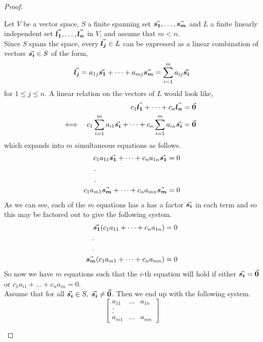 \documentclass[MathsNotesBase.tex]{subfiles}
\begin{document}
{\begin{proof}
\begin{enumerate}[label=(\roman*)]
{				Let $V$ be a vector space, $S$ a finite spanning set ${ \vec{\bm{s_1}}, \dots, \vec{\bm{s_m}} }$ and $L$ a finite linearly independent set ${ \vec{\bm{l_1}},\dots, \vec{\bm{l_n}} }$ in $V$, and assume that ${ m < n }$.\\
				Since $S$ spans the space, every ${ \vec{\bm{l_j}} \in L }$ can be expressed as a linear combination of vectors ${ \vec{\bm{s_i}} \in S }$ of the form,
				\[ \vec{\bm{l_j}} = a_{1j}\vec{\bm{s_1}} + \dots + a_{mj}\vec{\bm{s_m}} = \sum_{i=1}^m a_{ij}\vec{\bm{s_i}} \]
				for ${ 1 \leq j \leq n }$. A linear relation on the vectors of $L$ would look like,
				\begin{align*}
				&& c_1\vec{\bm{l_1}} + \dots + c_n\vec{\bm{l_n}} &= \vec{\bm{0}} \\
				&\iff & c_1\sum_{i=1}^m a_{i1}\vec{\bm{s_i}} + \dots + c_n\sum_{i=1}^m a_{in}\vec{\bm{s_i}}  &= \vec{\bm{0}} &\text{\scriptsize{}}
				\end{align*}
				which expands into $m$ simultaneous equations as follows.
				\begin{align*}
					c_1a_{11}\V{s_1} + \dots + c_na_{1n}\V{s_1}  &= 0 \\
					. \hspace{100pt} & \\
					. \hspace{100pt} & \\
					c_1a_{m1}\V{s_m} + \dots + c_na_{mn}\V{s_m}  &= 0
				\end{align*}
				As we can see, each of the $m$ equations has a has a factor $\vec{\bm{s_i}}$ in each term and so this may be factored out to give the following system.
				\begin{align*}
					\V{s_1}(c_1a_{11} + \dots + c_na_{1n})  &= 0 \\
					. \hspace{100pt} & \\
					. \hspace{100pt} & \\
					\V{s_m}(c_1a_{m1} + \dots + c_na_{mn})  &= 0
				\end{align*}
				So now we have $m$ equations such that the $i$-th equation will hold if either ${ \vec{\bm{s_i}} = \vec{\bm{0}} }$ or ${ c_1a_{i1} + \dots + c_na_{in} = 0 }$.\\
				Assume that for all ${ \vec{\bm{s_i}} \in S,\; \vec{\bm{s_i}} \neq \vec{\bm{0}} }$. Then we end up with the following system.
				\[
					\begin{bmatrix}
					a_{11} & \dots & a_{1n} \\
					. && \\
					. && \\
					a_{m1} & \dots & a_{mn}
					\end{bmatrix}
\]}
\end{enumerate}
\end{proof}}
\end{document}
